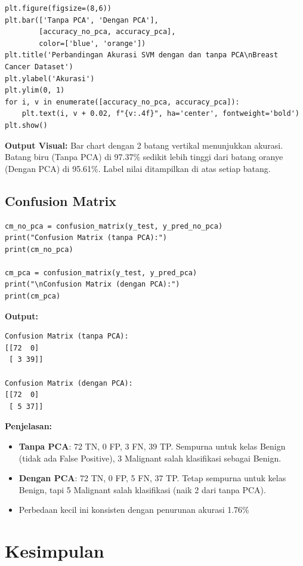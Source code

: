 \documentclass[12pt,a4paper]{article}
\begin{document}
\begin{lstlisting}[caption=Visualisasi Perbandingan Akurasi]
plt.figure(figsize=(8,6))
plt.bar(['Tanpa PCA', 'Dengan PCA'], 
        [accuracy_no_pca, accuracy_pca], 
        color=['blue', 'orange'])
plt.title('Perbandingan Akurasi SVM dengan dan tanpa PCA\nBreast Cancer Dataset')
plt.ylabel('Akurasi')
plt.ylim(0, 1)
for i, v in enumerate([accuracy_no_pca, accuracy_pca]):
    plt.text(i, v + 0.02, f"{v:.4f}", ha='center', fontweight='bold')
plt.show()
\end{lstlisting}

\textbf{Output Visual:} Bar chart dengan 2 batang vertikal menunjukkan akurasi. Batang biru (Tanpa PCA) di 97.37\% sedikit lebih tinggi dari batang oranye (Dengan PCA) di 95.61\%. Label nilai ditampilkan di atas setiap batang.

\subsection{Confusion Matrix}

\begin{lstlisting}[caption=Confusion Matrix Kedua Model]
cm_no_pca = confusion_matrix(y_test, y_pred_no_pca)
print("Confusion Matrix (tanpa PCA):")
print(cm_no_pca)

cm_pca = confusion_matrix(y_test, y_pred_pca)
print("\nConfusion Matrix (dengan PCA):")
print(cm_pca)
\end{lstlisting}

\textbf{Output:}
\begin{verbatim}
Confusion Matrix (tanpa PCA):
[[72  0]
 [ 3 39]]

Confusion Matrix (dengan PCA):
[[72  0]
 [ 5 37]]
\end{verbatim}

\textbf{Penjelasan:}
\begin{itemize}
    \item \textbf{Tanpa PCA}: 72 TN, 0 FP, 3 FN, 39 TP. Sempurna untuk kelas Benign (tidak ada False Positive), 3 Malignant salah klasifikasi sebagai Benign.
    \item \textbf{Dengan PCA}: 72 TN, 0 FP, 5 FN, 37 TP. Tetap sempurna untuk kelas Benign, tapi 5 Malignant salah klasifikasi (naik 2 dari tanpa PCA).
    \item Perbedaan kecil ini konsisten dengan penurunan akurasi 1.76\%
\end{itemize}

\section{Kesimpulan}
\end{document}
